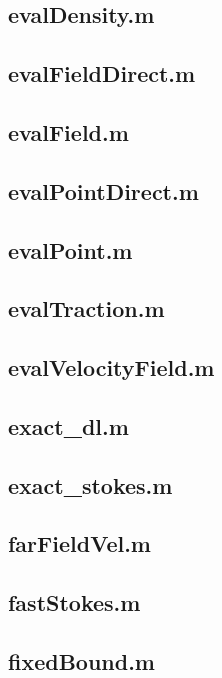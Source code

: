 \subsection{evalDensity.m}

\subsection{evalFieldDirect.m}

\subsection{evalField.m}

\subsection{evalPointDirect.m}

\subsection{evalPoint.m}

\subsection{evalTraction.m}

\subsection{evalVelocityField.m}

\subsection{exact\_dl.m}

\subsection{exact\_stokes.m}

\subsection{farFieldVel.m}

\subsection{fastStokes.m}

\subsection{fixedBound.m}

